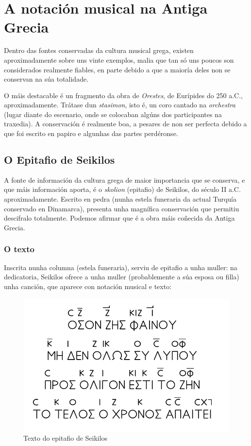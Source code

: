 %
%
\section{A notación musical na Antiga Grecia}


Dentro das fontes conservadas da cultura musical grega, existen aproximadamente sobre uns vinte exemplos, malia que tan só uns poucos son considerados realmente fiables, en parte debido a que a maioría deles non se conservan na súa totalidade. 

O máis destacable é un fragmento da obra de \textit{Orestes}, de Eurípides do 250 a.C., aproximadamente. Trátase dun \textit{stasimon}, isto é, un coro cantado na \textit{orchestra} (lugar diante do escenario, onde se colocaban algúns dos participantes na traxedia). A conservación é realmente boa, a pesares de non ser perfecta debido a que foi escrito en papiro e algunhas das partes perdéronse.

\subsection*{O Epitafio de Seikilos}

A fonte de información da cultura grega de maior importancia que se conserva, e que máis información aporta, é o \textit{skolion} (epitafio) de Seikilos, do século II a.C. aproximadamente. Escrito en pedra (nunha estela funeraria da actual Turquía conservado en Dinamarca), presenta unha magnífica conservación que permitiu descifralo totalmente. Podemos afirmar que é a obra máis coñecida da Antiga Grecia.

\subsubsection*{O texto}

Inscrita nunha columna (estela funeraria), serviu de epitafio a unha muller: na dedicatoria, Seikilos ofrece a unha muller (probablemente a súa esposa ou filla) unha canción, que aparece con notación musical e texto:

\begin{figure}[htp]
\centering
\includegraphics[scale=1.00]{images/Seikilos-Ejercicio-03.png}
\caption{Texto do epitafio de Seikilos}
\label{Seikilos-texto}
\end{figure}

